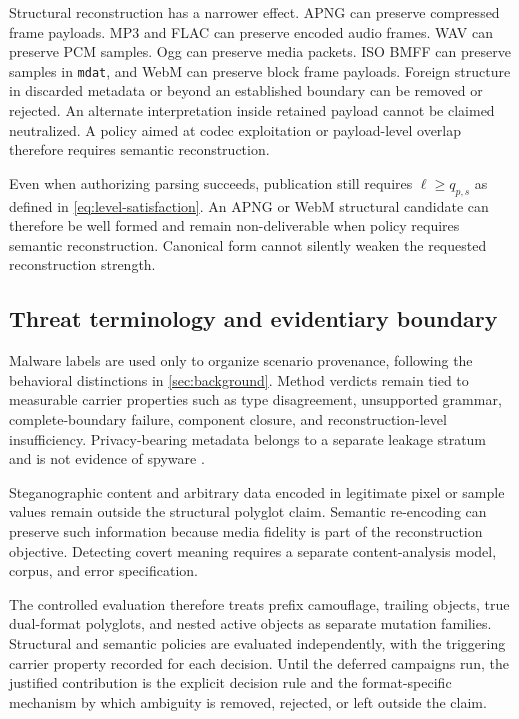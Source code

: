 Structural reconstruction has a narrower effect. APNG can preserve compressed
frame payloads. MP3 and FLAC can preserve encoded audio frames. WAV can preserve
PCM samples. Ogg can preserve media packets. ISO BMFF can preserve samples in
\texttt{mdat}, and WebM can preserve block frame payloads. Foreign structure in
discarded metadata or beyond an established boundary can be removed or rejected.
An alternate interpretation inside retained payload cannot be claimed
neutralized. A policy aimed at codec exploitation or payload-level overlap
therefore requires semantic reconstruction.

Even when authorizing parsing succeeds, publication still requires
\(\ell\geq q_{p,s}\) as defined in \cref{eq:level-satisfaction}. An APNG or
WebM structural candidate can therefore be well formed and remain
non-deliverable when policy requires semantic reconstruction. Canonical form
cannot silently weaken the requested reconstruction strength.

\subsection{Threat terminology and evidentiary boundary}

Malware labels are used only to organize scenario provenance, following the
behavioral distinctions in \cref{sec:background}. Method verdicts remain tied to
measurable carrier properties such as type disagreement, unsupported grammar,
complete-boundary failure, component closure, and reconstruction-level
insufficiency. Privacy-bearing metadata belongs to a separate leakage stratum
and is not evidence of spyware \cite{nist80083}.

Steganographic content and arbitrary data encoded in legitimate pixel or sample
values remain outside the structural polyglot claim. Semantic re-encoding can
preserve such information because media fidelity is part of the reconstruction
objective. Detecting covert meaning requires a separate content-analysis model,
corpus, and error specification.

The controlled evaluation therefore treats prefix camouflage, trailing objects,
true dual-format polyglots, and nested active objects as separate mutation
families. Structural and semantic policies are evaluated independently, with
the triggering carrier property recorded for each decision. Until the deferred
campaigns run, the justified contribution is the explicit decision rule and the
format-specific mechanism by which ambiguity is removed, rejected, or left
outside the claim.
